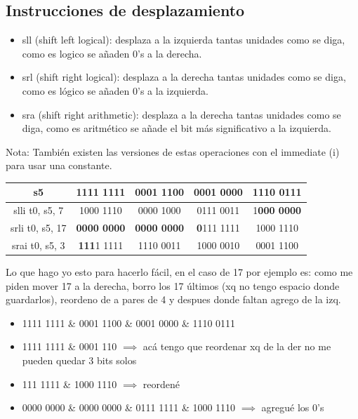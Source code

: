 \documentclass[10pt,a4paper]{article}
\begin{document}
\subsection*{Instrucciones de desplazamiento}
\begin{itemize}
    \item sll (shift left logical): desplaza a la izquierda tantas unidades como se diga, como es logico se añaden 0's a la derecha.
    \item srl (shift right logical): desplaza a la derecha tantas unidades como se diga, como es lógico se añaden 0's a la izquierda.
    \item sra (shift right arithmetic): desplaza a la derecha tantas unidades como se diga, como es aritmético se añade el bit más significativo a la izquierda.
\end{itemize}
Nota: También existen las versiones de estas operaciones con el immediate (i) para usar una constante.

\begin{table}[h!]
    \centering
    \begin{tabular}{|c | c | c | c| c|}
    \hline
    s5 & 1111 1111 & 0001 1100 & 0001 0000 & 1110 0111 \\ \hline
    slli t0, s5, 7 & 1000 1110 & 0000 1000 & 0111 0011 & 1\textbf{000 0000} \\ \hline
    srli t0, s5, 17 & \textbf{0000 0000} & \textbf{0000 0000} & \textbf{0}111 1111 & 1000 1110\\ \hline
    srai t0, s5, 3 & \textbf{111}1 1111 & 1110 0011 & 1000 0010 & 0001 1100\\ \hline
    \end{tabular}
    \label{tab:desplazamiento_riscv}
\end{table} 
Lo que hago yo esto para hacerlo fácil, en el caso de 17 por ejemplo es: como me piden mover 17 a la derecha, borro los 17 últimos (xq no tengo espacio donde guardarlos), reordeno de a pares de 4 y despues donde faltan agrego de la izq.
\begin{itemize}
\item 1111 1111 \& 0001 1100 \& 0001 0000 \& 1110 0111
\item 1111 1111 \& 0001 110 \(\implies\) acá tengo que reordenar xq de la der no me pueden quedar 3 bits solos
\item 111 1111 \& 1000 1110 \(\implies\) reordené
\item 0000 0000 \& 0000 0000 \& 0111 1111 \& 1000 1110 \(\implies\) agregué los 0's
\end{itemize}
\end{document}
